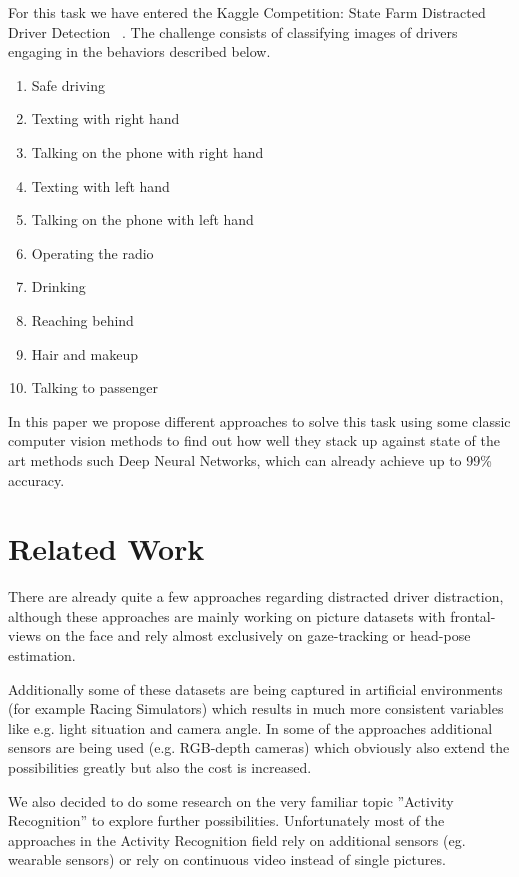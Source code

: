 \documentclass[10pt,twocolumn,letterpaper]{article}
\begin{document}
For this task we have entered the Kaggle Competition: State Farm Distracted Driver Detection ~\cite{Kaggle}. The challenge consists of classifying images of drivers engaging in the behaviors described below.

\begin{enumerate}
	\item Safe driving
	\item Texting with right hand
	\item Talking on the phone with right hand
	\item Texting with left hand
	\item Talking on the phone with left hand
	\item Operating the radio
	\item Drinking
	\item Reaching behind
	\item Hair and makeup
	\item Talking to passenger
\end{enumerate}

In this paper we propose different approaches to solve this task using some classic computer vision methods to find out how well they stack up against state of the art methods such Deep Neural Networks, which can already achieve up to 99\% accuracy.



\section{Related Work}

There are already quite a few approaches regarding distracted driver distraction, although these approaches are mainly working on picture datasets with frontal-views on the face and rely almost exclusively on gaze-tracking or head-pose estimation. \cite{Dorazio} \cite{6957817}

Additionally some of these datasets are being captured in artificial environments (for example Racing Simulators) \cite{itsc:bergasa2008} which results in much more consistent variables like e.g. light situation and camera angle. In some of the approaches additional sensors are being used (e.g. RGB-depth cameras) which obviously also extend the possibilities greatly but also the cost is increased. \cite{Ragab2014}

We also decided to do some research on the very familiar topic ''Activity Recognition'' to explore further possibilities. Unfortunately most of the approaches in the Activity Recognition field rely on additional sensors (eg. wearable sensors) \cite{6258525} \cite{6365160} or rely on continuous video instead of single pictures. \cite{1315249} \cite{1430826}
\end{document}
